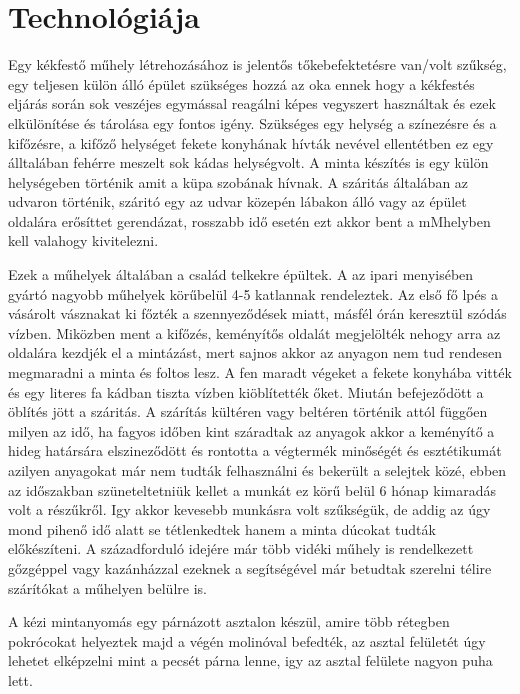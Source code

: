 \documentclass[fontsize=12pt, appendixprefix=true]{scrreprt}
\begin{document}
\section{Technológiája}
Egy kékfestő műhely létrehozásához is jelentős tőkebefektetésre van/volt szűkség, egy teljesen külön álló épület szükséges hozzá az oka ennek hogy a kékfestés eljárás során sok veszéjes egymással reagálni képes vegyszert használtak és ezek elkülönítése és tárolása egy fontos igény. Szükséges egy helység a színezésre és a kifőzésre, a  kifőző helységet fekete konyhának hívták nevével ellentétben ez egy álltalában fehérre meszelt sok kádas helységvolt. A minta készítés is egy külön helységeben történik amit a küpa szobának hívnak. A száritás általában az udvaron történik, száritó egy az udvar közepén lábakon álló vagy az épület oldalára erősíttet gerendázat, rosszabb idő esetén ezt akkor bent a mMhelyben kell valahogy kivitelezni.

Ezek a műhelyek általában a család telkekre épültek. A az ipari menyisében gyártó nagyobb műhelyek körűbelül 4-5 katlannak rendeleztek. Az első fő lpés a vásárolt vásznakat ki főzték a szennyeződések miatt, másfél órán keresztül szódás vízben. Miközben ment a kifőzés, keményítős oldalát megjelölték nehogy arra az oldalára kezdjék el a mintázást, mert sajnos akkor az anyagon nem tud rendesen megmaradni a minta és foltos lesz. A fen maradt végeket a fekete konyhába vitték és egy literes fa kádban tiszta vízben kiöblítették őket. Miután befejeződött a öblítés jött a száritás. A szárítás kültéren vagy beltéren történik attól függően milyen az idő, ha fagyos időben kint száradtak az anyagok akkor a keményítő a hideg határsára elszineződött és rontotta a végtermék minőségét és esztétikumát azilyen anyagokat már nem tudták felhasználni és bekerült a selejtek közé, ebben az időszakban szüneteltetniük kellet a munkát ez körű belül 6 hónap kimaradás volt a részűkről. Igy akkor kevesebb munkásra volt szűkségük, de addig az úgy mond pihenő idő alatt se tétlenkedtek hanem a minta dúcokat tudták előkészíteni.
A századforduló idejére már több vidéki műhely is rendelkezett gőzgéppel vagy kazánházzal ezeknek a segítségével már betudtak szerelni télire szárítókat a műhelyen belülre is.

A kézi mintanyomás egy párnázott asztalon készül, amire több rétegben pokrócokat helyeztek majd a végén molinóval befedték, az asztal felületét úgy lehetet elképzelni mint a pecsét párna lenne, igy az asztal felülete nagyon puha lett.
\end{document}
